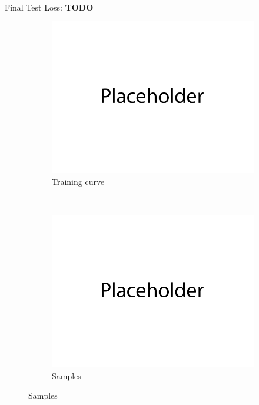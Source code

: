 \documentclass{article}
\begin{document}
\newpage
{}\\
Final Test Loss: \textbf{TODO} \\
\begin{figure}[H]
    \centering
    \begin{subfigure}{0.7\textwidth}
        \centering
        \includegraphics[width=\textwidth]{figures/q3_b_train_plot.png}
        \caption{Training curve}
    \end{subfigure}
    \\
    \begin{subfigure}{0.7\textwidth}
        \centering
        \includegraphics[width=\textwidth]{figures/q3_b_samples.png}
        \caption{Samples}
    \end{subfigure}
\end{figure}
\end{document}
